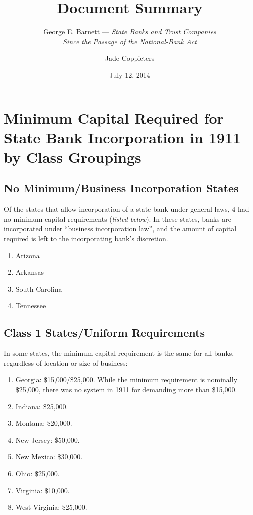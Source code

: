 ﻿\documentclass[12pt]{report}
\title{\Huge \bf Document Summary}
\subtitle{George E. Barnett --- \textit{State Banks and Trust Companies\\ Since the Passage of the National-Bank Act}}
\date{July 12, 2014}
\author{Jade Coppieters}
\begin{document}
\maketitle
\tableofcontents
\newpage

\chapter{Minimum Capital Required for State Bank Incorporation in 1911 by Class Groupings}

\section{No Minimum/Business Incorporation States}
Of the states that allow incorporation of a state bank under general laws, 4 had no minimum capital requirements (\textit{listed below}). In these states, banks are incorporated under ``business incorporation law'', and the amount of capital required is left to the incorporating bank's discretion.\\

    \begin{enumerate}
        \item Arizona
        \item Arkansas
        \item South Carolina
        \item Tennessee
    \end{enumerate}

\section{Class 1 States/Uniform Requirements}
In some states, the minimum capital requirement is the same for all banks, regardless of location or size of business:\\

    \begin{enumerate}
        \item Georgia: \$15,000/\$25,000. While the minimum requirement is nominally \$25,000, there was no system in 1911 for demanding more than \$15,000.
        \item Indiana: \$25,000.
        \item Montana: \$20,000.
        \item New Jersey: \$50,000.
        \item New Mexico: \$30,000.
        \item Ohio: \$25,000.
        \item Virginia: \$10,000.
        \item West Virginia: \$25,000.
    \end{enumerate}
\end{document}
